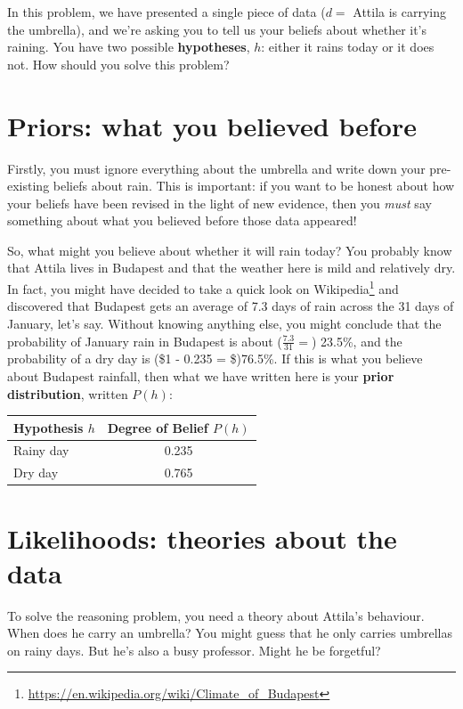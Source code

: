 \documentclass[
]{book}
\theoremstyle{definition}
\theoremstyle{definition}
\theoremstyle{definition}
\theoremstyle{definition}
\theoremstyle{remark}
\begin{document}
In this problem, we have presented a single piece of data (\(d =\) Attila is carrying the umbrella), and we're asking you to tell us your beliefs about whether it's raining. You have two possible \textbf{hypotheses}, \(h\): either it rains today or it does not. How should you solve this problem?

\hypertarget{priors-what-you-believed-before}{%
\section{Priors: what you believed before}\label{priors-what-you-believed-before}}

Firstly, you must ignore everything about the umbrella and write down your pre-existing beliefs about rain. This is important: if you want to be honest about how your beliefs have been revised in the light of new evidence, then you \emph{must} say something about what you believed before those data appeared!

So, what might you believe about whether it will rain today? You probably know that Attila lives in Budapest and that the weather here is mild and relatively dry. In fact, you might have decided to take a quick look on Wikipedia\footnote{\url{https://en.wikipedia.org/wiki/Climate_of_Budapest}} and discovered that Budapest gets an average of 7.3 days of rain across the 31 days of January, let's say. Without knowing anything else, you might conclude that the probability of January rain in Budapest is about (\(\frac{7.3}{31}=\)) 23.5\%, and the probability of a dry day is (\$1 - 0.235 = \$)76.5\%. If this is what you believe about Budapest rainfall, then what we have written here is your \textbf{prior distribution}, written \(P(h)\):

\begin{longtable}[]{@{}lc@{}}
\toprule()
Hypothesis \(h\) & Degree of Belief \(P(h)\) \\
\midrule()
\endhead
Rainy day & 0.235 \\
Dry day & 0.765 \\
\bottomrule()
\end{longtable}

\hypertarget{likelihoods-theories-about-the-data}{%
\section{Likelihoods: theories about the data}\label{likelihoods-theories-about-the-data}}

To solve the reasoning problem, you need a theory about Attila's behaviour. When does he carry an umbrella? You might guess that he only carries umbrellas on rainy days. But he's also a busy professor. Might he be forgetful?
\end{document}
